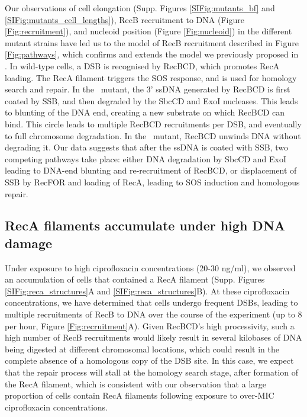Our observations of cell elongation (Supp. Figures \ref{SIFig:mutants_bf} and \ref{SIFig:mutants_cell_lengths}), RecB recruitment to DNA (Figure \ref{Fig:recruitment}), and nucleoid position (Figure \ref{Fig:nucleoid}) in the different mutant strains have led us to the model of RecB recruitment described in Figure \ref{Fig:pathways}, which confirms and extends the model we previously proposed in \cite{Lepore2023}. In wild-type cells, a DSB is recognised by RecBCD, which promotes RecA loading. The RecA filament triggers the SOS response, and is used for homology search and repair. In the \dreca\ mutant, the 3' ssDNA generated by RecBCD is first coated by SSB, and then degraded by the SbcCD and ExoI nucleases\cite{Zahradka2009}. This leads to blunting of the DNA end, creating a new substrate on which RecBCD can bind. This circle leads to multiple RecBCD recruitments per DSB, and eventually to full chromosome degradation. In the \geneteneighty\ mutant, RecBCD unwinds DNA without degrading it.  Our data suggests that after the ssDNA is coated with SSB, two competing pathways take place: either DNA degradation by SbcCD and ExoI leading to DNA-end blunting and re-recruitment of RecBCD, or displacement of SSB by RecFOR and loading of RecA, leading to SOS induction and homologous repair.

\subsection*{RecA filaments accumulate under high DNA damage}
Under exposure to high ciprofloxacin concentrations (20-30 ng/ml), we observed an accumulation of cells that contained a RecA filament (Supp. Figures \ref{SIFig:reca_structures}A and \ref{SIFig:reca_structures}B). At these ciprofloxacin concentrations, we have determined that cells undergo frequent DSBs, leading to multiple recruitments of RecB to DNA over the course of the experiment (up to 8 per hour, Figure \ref{Fig:recruitment}A). Given RecBCD's high processivity\cite{Wiktor2018}, such a high number of RecB recruitments would likely result in several kilobases of DNA being digested at different chromosomal locations, which could result in the complete absence of a homologous copy of the DSB site. In this case, we expect that the repair process will stall at the homology search stage, after formation of the RecA filament, which is consistent with our observation that a large proportion of cells contain RecA filaments following exposure to over-MIC ciprofloxacin concentrations.

